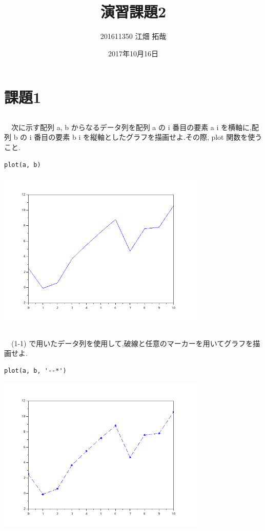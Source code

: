 \documentclass[a4j, 11pt]{jarticle}
\author{201611350 江畑 拓哉}
\date{2017年10月16日}
\title{演習課題2}
\begin{document}
\section{課題1}
\label{sec:orgbde3ad9}
\subsection{}
\label{sec:org8425996}
　次に示す配列 a, b からなるデータ列を配列 a の i 番目の要素 a i を横軸に,配列 b の i 番目の要素 b i を縦軸としたグラフを描画せよ.その際, plot 関数を使うこと.\\
\begin{verbatim}
plot(a, b)
\end{verbatim}


\begin{center}
\includegraphics[width=10cm]{./1-1.png}
\end{center}
\subsection{}
\label{sec:org0c8a648}
　(1-1) で用いたデータ列を使用して,破線と任意のマーカーを用いてグラフを描画せよ.\\
\begin{verbatim}
plot(a, b, '--*')
\end{verbatim}

\begin{center}
\includegraphics[width=10cm]{./1-2.png}
\end{center}
\end{document}
